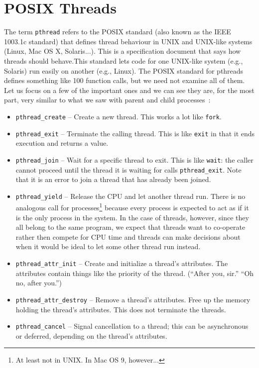 




\section*{POSIX Threads}

The term \texttt{pthread} refers to the POSIX standard (also known as the IEEE 1003.1c standard) that defines thread behaviour in UNIX and UNIX-like systems (Linux, Mac OS X, Solaris...). This is a specification document that says how threads should behave.This standard lets code for one UNIX-like system (e.g., Solaris) run easily on another (e.g., Linux). The POSIX standard for pthreads defines something like 100 function calls, but we need not examine all of them. Let us focus on a few of the important ones and we can see they are, for the most part, very similar to what we saw with parent and child processes~\cite{mos}:

\begin{itemize}
	\item \texttt{pthread\_create} -- Create a new thread. This works a lot like \texttt{fork}.
	\item \texttt{pthread\_exit} -- Terminate the calling thread. This is like \texttt{exit} in that it ends execution and returns a value.
	\item \texttt{pthread\_join} -- Wait for a specific thread to exit. This is like \texttt{wait}: the caller cannot proceed until the thread it is waiting for calls \texttt{pthread\_exit}. Note that it is an error to join a thread that has already been joined.
	\item \texttt{pthread\_yield} -- Release the CPU and let another thread run. There is no analogous call for processes\footnote{At least not in UNIX. In Mac OS 9, however...} because every process is expected to act as if it is the only process in the system. In the case of threads, however, since they all belong to the same program, we expect that threads want to co-operate rather then compete for CPU time and threads can make decisions about when it would be ideal to let some other thread run instead.
	\item \texttt{pthread\_attr\_init} -- Create and initialize a thread's attributes. The attributes contain things like the priority of the thread. (``After you, sir.'' ``Oh no, after you.'')
	\item \texttt{pthread\_attr\_destroy} -- Remove a thread's attributes. Free up the memory holding the thread's attributes. This does not terminate the threads.
	\item \texttt{pthread\_cancel} -- Signal cancellation to a thread; this can be asynchronous or deferred, depending on the thread's attributes.
\end{itemize}


